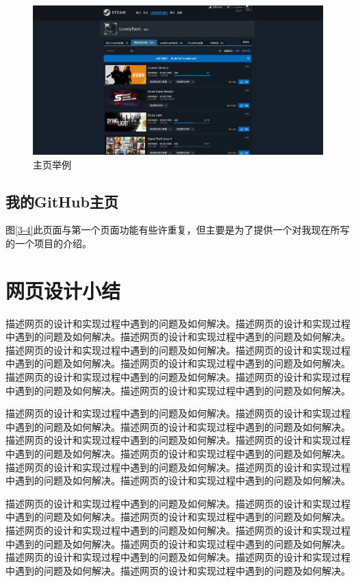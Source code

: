 \documentclass[supercite]{Experimental_Report}
\theoremstyle{definition}
\begin{document}
\begin{figure}[htb]
	\begin{center}
		\includegraphics[scale=0.30]{images/3-3.png}
		\caption{主页举例}
		\label{fig3-3}
	\end{center}
\end{figure}

\subsection{我的GitHub主页}

图\ref{3-4}此页面与第一个页面功能有些许重复，但主要是为了提供一个对我现在所写的一个项目的介绍。
\newpage

\section{网页设计小结}

描述网页的设计和实现过程中遇到的问题及如何解决。描述网页的设计和实现过程中遇到的问题及如何解决。描述网页的设计和实现过程中遇到的问题及如何解决。描述网页的设计和实现过程中遇到的问题及如何解决。描述网页的设计和实现过程中遇到的问题及如何解决。描述网页的设计和实现过程中遇到的问题及如何解决。描述网页的设计和实现过程中遇到的问题及如何解决。描述网页的设计和实现过程中遇到的问题及如何解决。描述网页的设计和实现过程中遇到的问题及如何解决。

描述网页的设计和实现过程中遇到的问题及如何解决。描述网页的设计和实现过程中遇到的问题及如何解决。描述网页的设计和实现过程中遇到的问题及如何解决。描述网页的设计和实现过程中遇到的问题及如何解决。描述网页的设计和实现过程中遇到的问题及如何解决。描述网页的设计和实现过程中遇到的问题及如何解决。描述网页的设计和实现过程中遇到的问题及如何解决。描述网页的设计和实现过程中遇到的问题及如何解决。描述网页的设计和实现过程中遇到的问题及如何解决。

描述网页的设计和实现过程中遇到的问题及如何解决。描述网页的设计和实现过程中遇到的问题及如何解决。描述网页的设计和实现过程中遇到的问题及如何解决。描述网页的设计和实现过程中遇到的问题及如何解决。描述网页的设计和实现过程中遇到的问题及如何解决。描述网页的设计和实现过程中遇到的问题及如何解决。描述网页的设计和实现过程中遇到的问题及如何解决。描述网页的设计和实现过程中遇到的问题及如何解决。描述网页的设计和实现过程中遇到的问题及如何解决。
\end{document}
